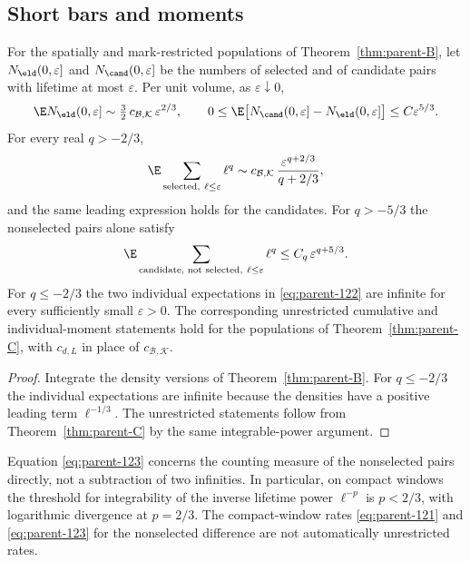 \subsection{Short bars and moments}\label{ssec:parent-moments}

\begin{corollary}\label{cor:parent-moments}
For the spatially and mark-restricted populations of Theorem~\ref{thm:parent-B}, let $N_\eld(0,\varepsilon]$ and $N_\cand(0,\varepsilon]$ be the numbers of selected and of candidate pairs with lifetime at most $\varepsilon$. Per unit volume, as $\varepsilon\downarrow0$,
\begin{equation}\label{eq:parent-121}
\E N_\eld(0,\varepsilon]\sim\tfrac32\,c_{\mathcal B,\mathcal K}\,\varepsilon^{2/3},\qquad 0\le\E\bigl[N_\cand(0,\varepsilon]-N_\eld(0,\varepsilon]\bigr]\le C\varepsilon^{5/3}.
\end{equation}
For every real $q>-2/3$,
\begin{equation}\label{eq:parent-122}
\E\sum_{\text{selected},\ \ell\le\varepsilon}\ell^q\sim c_{\mathcal B,\mathcal K}\,\frac{\varepsilon^{q+2/3}}{q+2/3},
\end{equation}
and the same leading expression holds for the candidates. For $q>-5/3$ the nonselected pairs alone satisfy
\begin{equation}\label{eq:parent-123}
\E\sum_{\text{candidate, not selected},\ \ell\le\varepsilon}\ell^q\le C_q\,\varepsilon^{q+5/3}.
\end{equation}
For $q\le-2/3$ the two individual expectations in \eqref{eq:parent-122} are infinite for every sufficiently small $\varepsilon>0$. The corresponding unrestricted cumulative and individual-moment statements hold for the populations of Theorem~\ref{thm:parent-C}, with $c_{d,L}$ in place of $c_{\mathcal B,\mathcal K}$.
\end{corollary}

\begin{proof}
Integrate the density versions of Theorem~\ref{thm:parent-B}. For $q\le-2/3$ the individual expectations are infinite because the densities have a positive leading term $\ell^{-1/3}$. The unrestricted statements follow from Theorem~\ref{thm:parent-C} by the same integrable-power argument.
\end{proof}

Equation \eqref{eq:parent-123} concerns the counting measure of the nonselected pairs directly, not a subtraction of two infinities. In particular, on compact windows the threshold for integrability of the inverse lifetime power $\ell^{-p}$ is $p<2/3$, with logarithmic divergence at $p=2/3$. The compact-window rates \eqref{eq:parent-121} and \eqref{eq:parent-123} for the nonselected difference are not automatically unrestricted rates.


